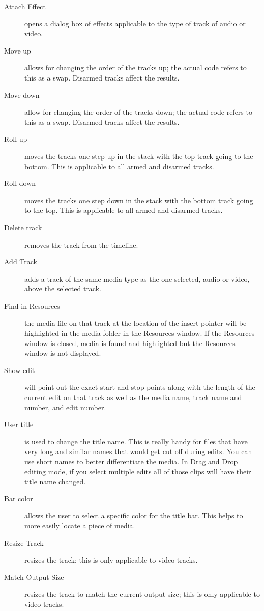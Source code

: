 \begin{description}
    \item[Attach Effect]  opens a dialog box of effects applicable to the type of track of audio or video.
    \item[Move up] allows for changing the order of the tracks up; the actual code refers
to this as a swap. Disarmed tracks affect the results.
    \item[Move down]  allow for changing the order of the tracks down; the actual code refers
to this as a swap.  Disarmed tracks affect the results.
    \item[Roll up] moves the tracks one step up in the stack with the top track going to the bottom.  This is applicable to all armed and disarmed tracks.
    \item[Roll down]  moves the tracks one step down in the stack with the
bottom track going to the top.  This is applicable to all armed and disarmed tracks.
    \item[Delete track]  removes the track from the timeline.
    \item[Add Track]  adds a track of the same media type as the one selected, audio or video, above the selected track.
    \item[Find in Resources]   the media file on that track at the location of the insert pointer will be highlighted in the media folder in the Resources window. If the 
	Resources window is closed, media is found and highlighted but the Resources window is not displayed.
    \item[Show edit]   will point out the exact start and stop points along with the length of the current edit on
        that track as well as the media name, track name and number, and edit number.
    \item[User title]   is used to change the title name.  This is really handy for files that have very long and
        similar names that would get cut off during edits.  You can use short names to better differentiate the
        media. In Drag and Drop editing mode, if you select multiple edits all of those clips will have
their title name changed.
    \item[Bar color]  allows the user to select a specific color for the title bar.  This helps to more easily locate a piece of media.
    \item[Resize Track]  resizes the track; this is only applicable to video tracks.
    \item[Match Output Size]  resizes the track to match the current output size; this is only applicable to video tracks.
\end{description}


